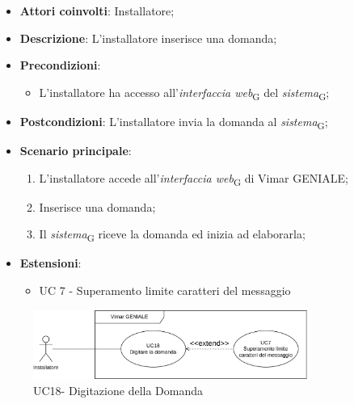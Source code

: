 \begin{itemize}
    \item \textbf{Attori coinvolti}: Installatore;
    \item \textbf{Descrizione}: L’installatore inserisce una domanda;
    \item \textbf{Precondizioni}: 
        \begin{itemize}
            \item L’installatore ha accesso all’\textit{interfaccia web}\textsubscript{G} del \textit{sistema}\textsubscript{G};
        \end{itemize}
    \item \textbf{Postcondizioni}: L'installatore invia la domanda al \textit{sistema}\textsubscript{G};
    \item \textbf{Scenario principale}:
    \begin{enumerate}
    \item L’installatore accede all’\textit{interfaccia web}\textsubscript{G} di Vimar GENIALE;
    \item Inserisce una domanda;
    \item Il \textit{sistema}\textsubscript{G} riceve la domanda ed inizia ad elaborarla;
    \end{enumerate}
    \item \textbf{Estensioni}: 
        \begin{itemize}
            \item UC 7 - Superamento limite caratteri del messaggio
        \end{itemize}
\end{itemize}
\begin{figure}[H]
\centering
\includegraphics[width=0.8\textwidth]{contents/casi_duso/png/UC18.png}
\caption{UC18- Digitazione della Domanda}
\end{figure}
